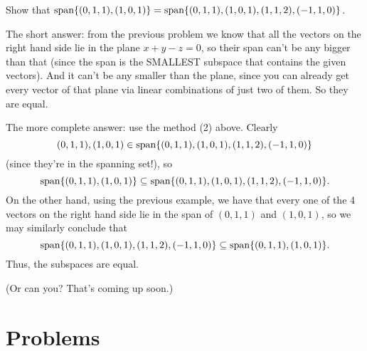 \begin{myprob} Show that $\textrm{span}\{(0,1,1),(1,0,1)\} = \textrm{span}\{(0,1,1),(1,0,1),(1,1,2),(-1,1,0)\}$.

\begin{mysol} The short answer:  from the previous problem we know that all the
vectors on the right hand side lie in the plane $x+y-z=0$, so their
span can't be any bigger than that (since the span is the SMALLEST
subspace that contains the given vectors).  And it can't be any
smaller than the plane, since you can already get every vector
of that plane via linear combinations of just two of them.  So
they are equal.

The more complete answer:  use the method (2) above.  Clearly
$$(0,1,1), (1,0,1) \in \textrm{span}\{(0,1,1),(1,0,1),(1,1,2),(-1,1,0)\}$$
(since they're in the spanning set!), so 
$$
\textrm{span}\{(0,1,1),(1,0,1)\} \subseteq \textrm{span}\{(0,1,1),(1,0,1),(1,1,2),(-1,1,0)\}.
$$
On the other hand, using the previous example, we have that every
one of the 4 vectors on the right hand side lie in the span of
$(0,1,1)$ and $(1,0,1)$, so we may similarly conclude that
$$
\textrm{span}\{(0,1,1),(1,0,1),(1,1,2),(-1,1,0)\} \subseteq \textrm{span}\{(0,1,1),(1,0,1)\}.
$$
Thus, the subspaces are equal. \end{mysol}\end{myprob}


(Or can you?  That's coming up soon.)


\section*{Problems}
%


